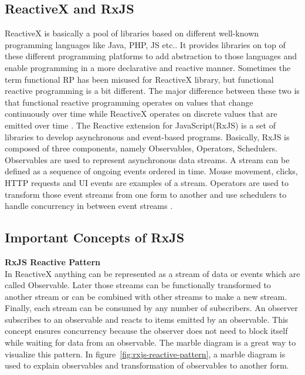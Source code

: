\subsection{ReactiveX and RxJS}
ReactiveX is basically a pool of libraries based on different well-known programming languages like Java, PHP, JS etc.. It provides libraries on top of these different programming platforms to add abstraction to those languages and enable programming in a more declarative and reactive manner. Sometimes the term functional RP has been misused for ReactiveX library, but functional reactive programming is a bit different. The major difference between these two is that functional reactive programming operates on values that change continuously over time while ReactiveX operates on discrete values that are emitted over time \cite{reactivex}. 
The Reactive extension for JavaScript(RxJS) is a set of libraries to develop asynchronous and event-based programs. Basically, RxJS is composed of three components, namely Observables, Operators, Schedulers. Observables are used to represent asynchronous data streams. A stream can be defined as a sequence of ongoing events ordered in time. Mouse movement, clicks, HTTP requests and UI events are examples of a stream. Operators are used to transform those event streams from one form to another and use schedulers to
handle concurrency in between event streams \cite{rxjs}.

\subsection{Important Concepts of RxJS}
\textbf{RxJS Reactive Pattern}\\
In ReactiveX anything can be represented as a stream of data or events which are called Observable. Later those streams can be functionally transformed to another stream or can be combined with other streams to make a new stream. Finally, each stream can be consumed by any number of subscribers. An observer subscribes to an observable and reacts to items emitted by an observable. This concept ensures concurrency because the observer does not need to block itself while waiting for data from an observable. The marble diagram is a great way to visualize this pattern. In figure~\ref{fig:rxjs-reactive-pattern}, a marble diagram is used to explain observables and transformation of observables to another form.


